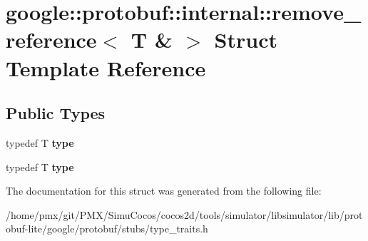 \hypertarget{structgoogle_1_1protobuf_1_1internal_1_1remove__reference_3_01T_01_6_01_4}{}\section{google\+:\+:protobuf\+:\+:internal\+:\+:remove\+\_\+reference$<$ T \& $>$ Struct Template Reference}
\label{structgoogle_1_1protobuf_1_1internal_1_1remove__reference_3_01T_01_6_01_4}
\subsection*{Public Types}
\begin{DoxyCompactItemize}
\item 
\mbox{\label{structgoogle_1_1protobuf_1_1internal_1_1remove__reference_3_01T_01_6_01_4_a20018e1922171001451c12d5169baf9f}} 
typedef T {\bfseries type}
\item 
\mbox{\label{structgoogle_1_1protobuf_1_1internal_1_1remove__reference_3_01T_01_6_01_4_a20018e1922171001451c12d5169baf9f}} 
typedef T {\bfseries type}
\end{DoxyCompactItemize}


The documentation for this struct was generated from the following file\+:\begin{DoxyCompactItemize}
\item 
/home/pmx/git/\+P\+M\+X/\+Simu\+Cocos/cocos2d/tools/simulator/libsimulator/lib/protobuf-\/lite/google/protobuf/stubs/type\+\_\+traits.\+h\end{DoxyCompactItemize}
